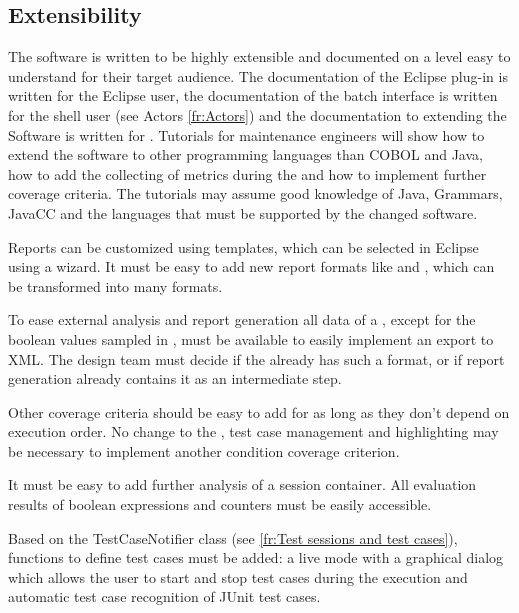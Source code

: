 \subsection{Extensibility} \label{nf:Extensibility}
The software is written to be highly extensible and documented on a level easy to understand for their target audience. The documentation of the Eclipse plug-in is written for the Eclipse user, the documentation of the batch interface is written for the shell user (see Actors \ref{fr:Actors}) and the documentation to extending the Software is written for . Tutorials for maintenance engineers will show how to extend the software to other programming languages than COBOL and Java, how to add the collecting of metrics during the  and how to implement further coverage criteria. The tutorials may assume good knowledge of Java, Grammars, JavaCC and the languages that must be supported by the changed software.
\par
Reports can be customized using templates, which can be selected in Eclipse using a wizard. It must be easy to add new report formats like  and , which can be transformed into many formats.
\par
To ease external analysis and report generation all data of a , except for the boolean values sampled in , must be available to easily implement an export to XML. The design team must decide if the  already has such a format, or if report generation already contains it as an intermediate step.
\par
Other coverage criteria should be easy to add for  as long as they
don't depend on execution order. No change to the , test case management and highlighting may be necessary to implement another condition coverage criterion.
\par
It must be easy to add further analysis of a session container. All evaluation results of boolean expressions and counters must be easily accessible.
\par
Based on the TestCaseNotifier class (see \ref{fr:Test sessions and test cases}), functions to define test cases must be added: a live mode with a graphical dialog which allows the user to start and stop test cases during the  execution and automatic test case recognition of JUnit test cases.
